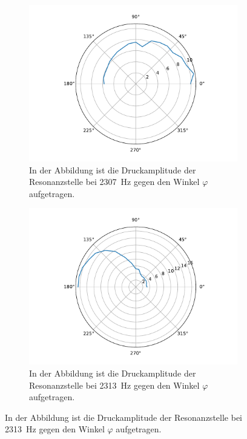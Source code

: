             \FloatBarrier
            \begin{figure}[ht]
                \centering
                \begin{subfigure}[b]{0.45\textwidth}
                    \centering
                    \includegraphics[scale=0.3]{./pictures/H_mol_resonanz_1_2307Hz.pdf}
                    \caption{In der Abbildung ist die Druckamplitude der Resonanzstelle bei \SI{2307}{\hertz} gegen den Winkel $\varphi$ aufgetragen.}
                    \label{fig:H_mol_resonanz_1_2307Hz}
                \end{subfigure}
                \hfill
                \centering
                \begin{subfigure}[b]{0.45\textwidth}
                    \centering
                    \includegraphics[scale=0.3]{./pictures/H_mol_resonanz_1_2313Hz.pdf}
                    \caption{In der Abbildung ist die Druckamplitude der Resonanzstelle bei \SI{2313}{\hertz} gegen den Winkel $\varphi$ aufgetragen.}
                    \label{fig:H_mol_resonanz_1_2313Hz}
                \end{subfigure}


\end{figure}
